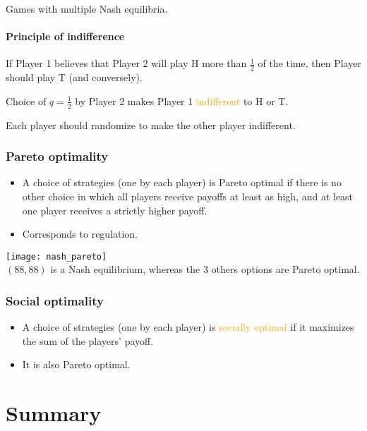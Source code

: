 Games with multiple Nash equilibria.

\paragraph{Principle of indifference}

If Player 1 believes that Player 2 will play H more than $\frac{1}{2}$ of the time, then Player should play T (and conversely).

Choice of $q = \frac{1}{2}$ by Player 2 makes Player 1 \textcolor{orange}{indifferent} to H or T.

Each player should randomize to make the other player indifferent.

\subsubsection{Pareto optimality}

\begin{itemize}
\item A choice of strategies (one by each player) is Pareto optimal if there is no other choice in which all players receive payoffs at least as high, and at least one player receives a strictly higher payoff.
\item Corresponds to regulation.
\end{itemize}

\begin{table}[H]
    \centering
    \texttt{[image: nash\_pareto]}\\
    $(88, 88)$ is a Nash equilibrium, whereas the 3 others options are Pareto optimal.
\end{table}

\subsubsection{Social optimality}

\begin{itemize}
\item A choice of strategies (one by each player) is \textcolor{orange}{socially optimal} if it maximizes the sum of the players' payoff.
\item It is also Pareto optimal.
\end{itemize}

\section{Summary}

